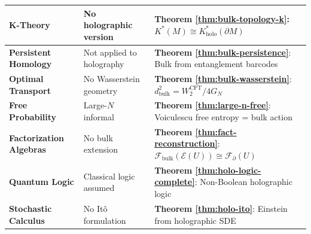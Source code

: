 \documentclass[12pt,a4paper]{article}
\begin{document}
\begin{center}
\begin{tabular}{|p{4cm}|p{5cm}|p{5cm}|}
\hline
\textbf{K-Theory} & No holographic version & \textbf{Theorem \ref{thm:bulk-topology-k}}: $K^*(M) \cong K_{\text{holo}}^*(\partial M)$ \\
\hline
\textbf{Persistent Homology} & Not applied to holography & \textbf{Theorem \ref{thm:bulk-persistence}}: Bulk from entanglement barcodes \\
\hline
\textbf{Optimal Transport} & No Wasserstein geometry & \textbf{Theorem \ref{thm:bulk-wasserstein}}: $d_{\text{bulk}}^2 = W_2^{\text{CFT}}/4G_N$ \\
\hline
\textbf{Free Probability} & Large-$N$ informal & \textbf{Theorem \ref{thm:large-n-free}}: Voiculescu free entropy = bulk action \\
\hline
\textbf{Factorization Algebras} & No bulk extension & \textbf{Theorem \ref{thm:fact-reconstruction}}: $\mathcal{F}_{\text{bulk}}(\mathcal{E}(U)) \cong \mathcal{F}_{\partial}(U)$ \\
\hline
\textbf{Quantum Logic} & Classical logic assumed & \textbf{Theorem \ref{thm:holo-logic-complete}}: Non-Boolean holographic logic \\
\hline
\textbf{Stochastic Calculus} & No It\^o formulation & \textbf{Theorem \ref{thm:holo-ito}}: Einstein from holographic SDE \\
\hline
\end{tabular}
\end{center}
\end{document}
